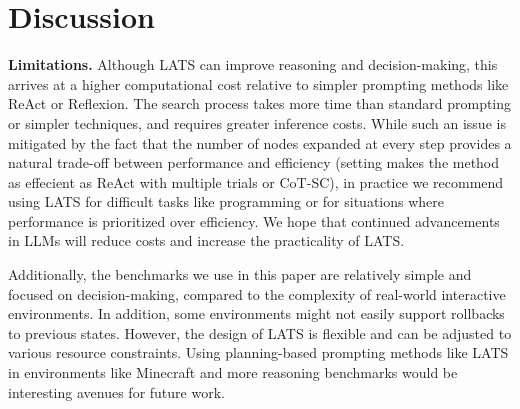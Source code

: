 \documentclass{article} \usepackage{iclr2024_conference,times}
\begin{document}
\section{Discussion}
\label{sec:discussion}
\textbf{Limitations.} Although LATS can improve reasoning and decision-making, this arrives at a higher computational cost {relative to simpler prompting methods like ReAct or Reflexion}. The search process takes more time than standard prompting or simpler techniques, and requires greater inference costs. {While such an issue is mitigated by the fact that the number of nodes  expanded at every step provides a natural trade-off between performance and efficiency (setting  makes the method as effecient as ReAct with multiple trials or CoT-SC)}, in practice we recommend using LATS for difficult tasks like programming or for situations where performance is prioritized over efficiency. We hope that continued advancements in LLMs will reduce costs and increase the practicality of LATS.

{
Additionally, the benchmarks we use in this paper are relatively simple and focused on decision-making, compared to the complexity of real-world interactive environments. In addition, some environments might not easily support rollbacks to previous states. However, the design of LATS is flexible and can be adjusted to various resource constraints. Using planning-based prompting methods like LATS in environments like Minecraft \citep{fan2022minedojo} and more reasoning benchmarks would be interesting avenues for future work. 
}
\end{document}
